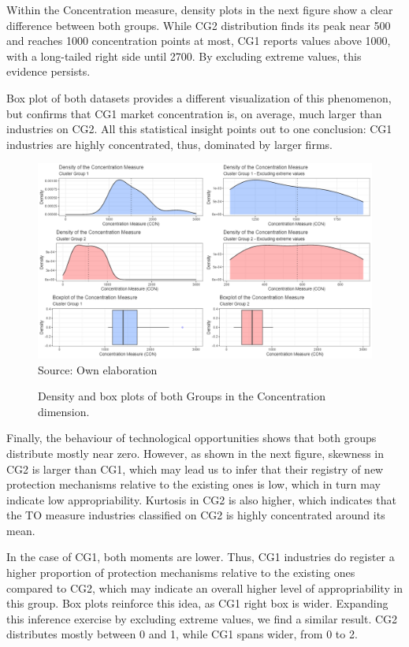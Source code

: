 \documentclass[12pt,a4paper]{article}
\begin{document}
Within the Concentration measure, density plots in the next figure show a clear difference between both groups.  While CG2 distribution finds its peak near 500 and reaches 1000 concentration points at most, CG1 reports values above 1000, with a long-tailed right side until 2700. By excluding extreme values, this evidence persists. 

Box plot of both datasets provides a different visualization of this phenomenon, but confirms that CG1 market concentration is, on average, much larger than industries on CG2. All this statistical insight points out to one conclusion: CG1 industries are highly concentrated, thus, dominated by larger firms. 

\begin{figure}[H]	
	\caption{Density and box plots of both Groups in the Concentration dimension.}
	\centering
	\includegraphics[scale = 0.45]{pcon.png}
		Source: Own elaboration
\end{figure}

Finally, the behaviour of technological opportunities shows that both groups distribute mostly near zero. However, as shown in the next figure, skewness in CG2 is larger than CG1, which may lead us to infer that their registry of new protection mechanisms relative to the existing ones is low, which in turn may indicate low appropriability. Kurtosis in CG2 is also higher, which indicates that the TO measure industries classified on CG2 is highly concentrated around its mean. 

In the case of CG1, both moments are lower. Thus, CG1 industries do register a higher proportion of protection mechanisms relative to the existing ones compared to CG2, which may indicate an overall higher level of appropriability in this group. Box plots reinforce this idea, as CG1 right box is wider. Expanding this inference exercise by excluding extreme values, we find a similar result. CG2 distributes mostly between 0 and 1, while CG1 spans wider, from 0 to 2.
\end{document}
